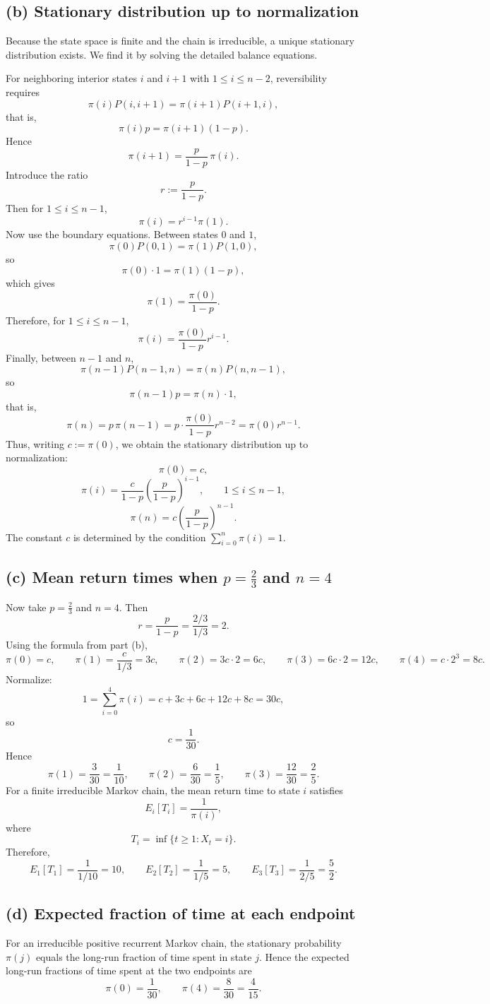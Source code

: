 \documentclass[11pt]{article}
\begin{document}
\subsection*{(b) Stationary distribution up to normalization}
Because the state space is finite and the chain is irreducible, a unique stationary distribution exists. We find it by solving the detailed balance equations.

For neighboring interior states $i$ and $i+1$ with $1\le i\le n-2$, reversibility requires
\[
\pi(i)P(i,i+1)=\pi(i+1)P(i+1,i),
\]
that is,
\[
\pi(i)p=\pi(i+1)(1-p).
\]
Hence
\[
\pi(i+1)=\frac{p}{1-p}\,\pi(i).
\]
Introduce the ratio
\[
r:=\frac{p}{1-p}.
\]
Then for $1\le i\le n-1$,
\[
\pi(i)=r^{i-1}\pi(1).
\]
Now use the boundary equations. Between states $0$ and $1$,
\[
\pi(0)P(0,1)=\pi(1)P(1,0),
\]
so
\[
\pi(0)\cdot 1=\pi(1)(1-p),
\]
which gives
\[
\pi(1)=\frac{\pi(0)}{1-p}.
\]
Therefore, for $1\le i\le n-1$,
\[
\pi(i)=\frac{\pi(0)}{1-p}r^{i-1}.
\]
Finally, between $n-1$ and $n$,
\[
\pi(n-1)P(n-1,n)=\pi(n)P(n,n-1),
\]
so
\[
\pi(n-1)p=\pi(n)\cdot 1,
\]
that is,
\[
\pi(n)=p\,\pi(n-1)=p\cdot \frac{\pi(0)}{1-p}r^{n-2}=\pi(0)r^{n-1}.
\]
Thus, writing $c:=\pi(0)$, we obtain the stationary distribution up to normalization:
\[
\pi(0)=c,
\]
\[
\pi(i)=\frac{c}{1-p}\left(\frac{p}{1-p}\right)^{i-1},\qquad 1\le i\le n-1,
\]
\[
\pi(n)=c\left(\frac{p}{1-p}\right)^{n-1}.
\]
The constant $c$ is determined by the condition $\sum_{i=0}^n\pi(i)=1$.

\subsection*{(c) Mean return times when $p=\tfrac23$ and $n=4$}
Now take $p=\frac23$ and $n=4$. Then
\[
r=\frac{p}{1-p}=\frac{2/3}{1/3}=2.
\]
Using the formula from part (b),
\[
\pi(0)=c,
\qquad
\pi(1)=\frac{c}{1/3}=3c,
\qquad
\pi(2)=3c\cdot 2=6c,
\qquad
\pi(3)=6c\cdot 2=12c,
\qquad
\pi(4)=c\cdot 2^3=8c.
\]
Normalize:
\[
1=\sum_{i=0}^4\pi(i)=c+3c+6c+12c+8c=30c,
\]
so
\[
c=\frac1{30}.
\]
Hence
\[
\pi(1)=\frac{3}{30}=\frac1{10},
\qquad
\pi(2)=\frac{6}{30}=\frac15,
\qquad
\pi(3)=\frac{12}{30}=\frac25.
\]
For a finite irreducible Markov chain, the mean return time to state $i$ satisfies
\[
E_i[T_i]=\frac{1}{\pi(i)},
\]
where
\[
T_i=\inf\{t\ge1:X_t=i\}.
\]
Therefore,
\[
E_1[T_1]=\frac{1}{1/10}=10,
\qquad
E_2[T_2]=\frac{1}{1/5}=5,
\qquad
E_3[T_3]=\frac{1}{2/5}=\frac52.
\]

\subsection*{(d) Expected fraction of time at each endpoint}
For an irreducible positive recurrent Markov chain, the stationary probability $\pi(j)$ equals the long-run fraction of time spent in state $j$. Hence the expected long-run fractions of time spent at the two endpoints are
\[
\pi(0)=\frac1{30},
\qquad
\pi(4)=\frac{8}{30}=\frac{4}{15}.
\]
\end{document}
